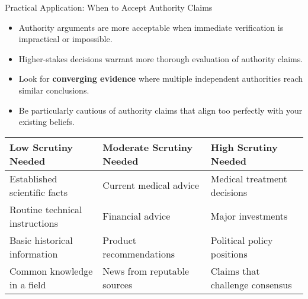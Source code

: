 \documentclass{beamer}
\begin{document}
\begin{frame}{Practical Application: When to Accept Authority Claims}
    \begin{itemize}
        \item Authority arguments are more acceptable when immediate verification is impractical or impossible.
        \item Higher-stakes decisions warrant more thorough evaluation of authority claims.
        \item Look for \textbf{converging evidence} where multiple independent authorities reach similar conclusions.
        \item Be particularly cautious of authority claims that align too perfectly with your existing beliefs.
    \end{itemize}
    
    \begin{table}
        \scriptsize
        \centering
        \begin{tabular}{|p{3.5cm}|p{3.5cm}|p{3.5cm}|}
            \hline
            \textbf{Low Scrutiny Needed} & \textbf{Moderate Scrutiny Needed} & \textbf{High Scrutiny Needed} \\
            \hline
            Established scientific facts & Current medical advice & Medical treatment decisions \\
            Routine technical instructions & Financial advice & Major investments \\
            Basic historical information & Product recommendations & Political policy positions \\
            Common knowledge in a field & News from reputable sources & Claims that challenge consensus \\
            \hline
        \end{tabular}
    \end{table}
\end{frame}
\end{document}

